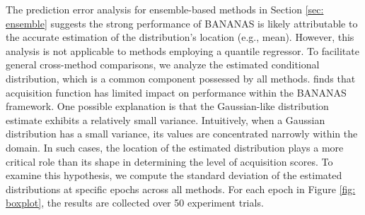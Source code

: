 \documentclass[a4paper,oneside,bibliography=totoc]{scrbook}
\begin{document}
The prediction error analysis for ensemble-based methods in Section \ref{sec: ensemble} suggests the strong performance of BANANAS is likely attributable to the accurate estimation of the distribution's location (e.g., mean). However, this analysis is not applicable to methods employing a quantile regressor. To facilitate general cross-method comparisons, we analyze the estimated conditional distribution, which is a common component possessed by all methods.  \cite{white2019bananas} finds that  acquisition function has limited impact on performance within the BANANAS framework. One possible explanation is that the Gaussian-like distribution estimate exhibits a relatively small variance. Intuitively, when a Gaussian distribution has a small variance, its values are concentrated narrowly within the domain. In such cases, the location of the estimated distribution plays a more critical role than its shape in determining the level of acquisition scores. To examine this hypothesis, we compute the standard deviation of the estimated  distributions at specific epochs across all methods. For each epoch in Figure \ref{fig: boxplot}, the results are collected over 50 experiment trials.
\end{document}
